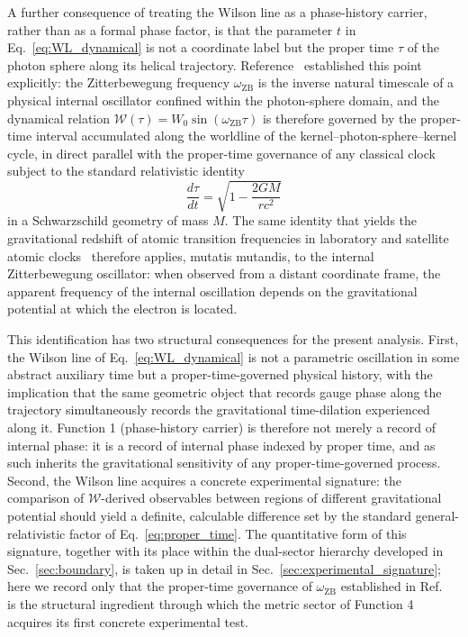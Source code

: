 \documentclass[%
 reprint, amsmath,amssymb, aps, prb, ]{revtex4-2}
\numberwithin{equation}{section}
\newcommand{\omZB}{\omega_{\text{ZB}}}
\newcommand{\WL}{\mathcal{W}}
\begin{document}
A further consequence of treating the Wilson line as a phase-history carrier, rather than as a formal phase factor, is that the parameter $t$ in Eq.~\eqref{eq:WL_dynamical} is not a coordinate label but the proper time $\tau$ of the photon sphere along its helical trajectory. Reference~\cite{hanamura22} established this point explicitly: the Zitterbewegung frequency $\omZB$ is the inverse natural timescale of a physical internal oscillator confined within the photon-sphere domain, and the dynamical relation $\WL(\tau) = W_0 \sin(\omZB \tau)$ is therefore governed by the proper-time interval accumulated along the worldline of the kernel--photon-sphere--kernel cycle, in direct parallel with the proper-time governance of any classical clock subject to the standard relativistic identity
\begin{equation}
\frac{d\tau}{dt} = \sqrt{1 - \frac{2GM}{rc^2}}
\label{eq:proper_time}
\end{equation}
in a Schwarzschild geometry of mass $M$. The same identity that yields the gravitational redshift of atomic transition frequencies in laboratory and satellite atomic clocks~\cite{ashby2003, ludlow2015} therefore applies, mutatis mutandis, to the internal Zitterbewegung oscillator: when observed from a distant coordinate frame, the apparent frequency of the internal oscillation depends on the gravitational potential at which the electron is located.

This identification has two structural consequences for the present analysis. First, the Wilson line of Eq.~\eqref{eq:WL_dynamical} is not a parametric oscillation in some abstract auxiliary time but a proper-time-governed physical history, with the implication that the same geometric object that records gauge phase along the trajectory simultaneously records the gravitational time-dilation experienced along it. Function 1 (phase-history carrier) is therefore not merely a record of internal phase: it is a record of internal phase indexed by proper time, and as such inherits the gravitational sensitivity of any proper-time-governed process. Second, the Wilson line acquires a concrete experimental signature: the comparison of $\WL$-derived observables between regions of different gravitational potential should yield a definite, calculable difference set by the standard general-relativistic factor of Eq.~\eqref{eq:proper_time}. The quantitative form of this signature, together with its place within the dual-sector hierarchy developed in Sec.~\ref{sec:boundary}, is taken up in detail in Sec.~\ref{sec:experimental_signature}; here we record only that the proper-time governance of $\omZB$ established in Ref.~\cite{hanamura22} is the structural ingredient through which the metric sector of Function 4 acquires its first concrete experimental test.
\end{document}
